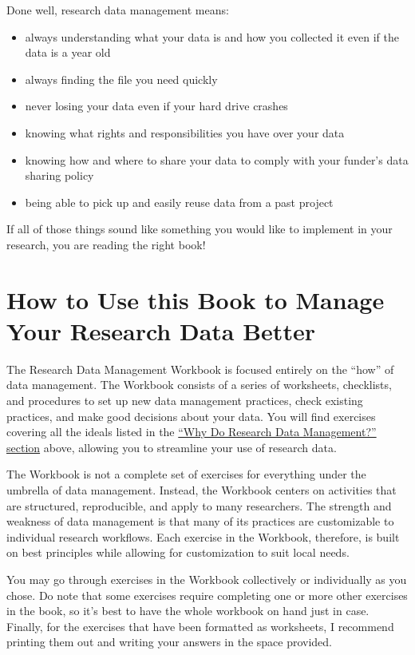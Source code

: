 \documentclass[
]{book}
\providecommand{\tightlist}{%
  \setlength{\itemsep}{0pt}\setlength{\parskip}{0pt}}
\begin{document}
Done well, research data management means:

\begin{itemize}
\tightlist
\item
  always understanding what your data is and how you collected it even if the data is a year old
\item
  always finding the file you need quickly
\item
  never losing your data even if your hard drive crashes
\item
  knowing what rights and responsibilities you have over your data
\item
  knowing how and where to share your data to comply with your funder's data sharing policy
\item
  being able to pick up and easily reuse data from a past project
\end{itemize}

If all of those things sound like something you would like to implement in your research, you are reading the right book!

\hypertarget{how-rdm}{%
\section{How to Use this Book to Manage Your Research Data Better}\label{how-rdm}}

The Research Data Management Workbook is focused entirely on the ``how'' of data management. The Workbook consists of a series of worksheets, checklists, and procedures to set up new data management practices, check existing practices, and make good decisions about your data. You will find exercises covering all the ideals listed in the \protect\hyperlink{why-rdm}{``Why Do Research Data Management?'' section} above, allowing you to streamline your use of research data.

The Workbook is not a complete set of exercises for everything under the umbrella of data management. Instead, the Workbook centers on activities that are structured, reproducible, and apply to many researchers. The strength and weakness of data management is that many of its practices are customizable to individual research workflows. Each exercise in the Workbook, therefore, is built on best principles while allowing for customization to suit local needs.

You may go through exercises in the Workbook collectively or individually as you chose. Do note that some exercises require completing one or more other exercises in the book, so it's best to have the whole workbook on hand just in case. Finally, for the exercises that have been formatted as worksheets, I recommend printing them out and writing your answers in the space provided.
\end{document}
